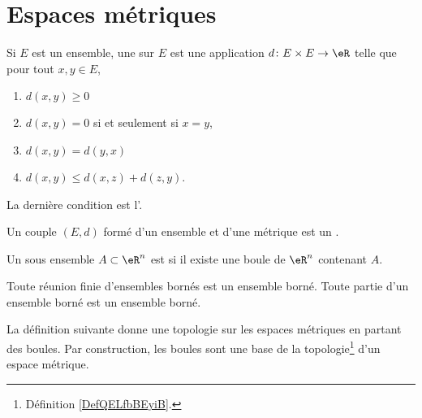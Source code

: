 
\section{Espaces métriques}

\begin{definition}  \label{DefMVNVFsX}
    Si $E$ est un ensemble, une  sur $E$ est une application $d\colon E\times E\to \eR$ telle que pour tout $x,y\in E$,
    \begin{enumerate}

    \item
    $d(x,y)\geq 0$

    \item
    $d(x,y)=0$ si et seulement si $x=y$,

    \item
    $d(x,y)=d(y,x)$

    \item
    $d(x,y)\leq d(x,z)+d(z,y)$.

    \end{enumerate}
    La dernière condition est l'. 

    Un couple $(E,d)$ formé d'un ensemble et d'une métrique est un .
\end{definition}


\begin{definition}
  Un sous ensemble $A \subset \eR^n$ est  si il existe une boule de $\eR^n$ contenant $A$.
\end{definition}

\begin{proposition}
  Toute réunion finie d'ensembles bornés est un ensemble borné. Toute partie d'un ensemble borné est un ensemble borné.
\end{proposition}

La définition suivante donne une topologie sur les espaces métriques en partant des boules. Par construction, les boules sont une base de la topologie\footnote{Définition \ref{DefQELfbBEyiB}.} d'un espace métrique.

